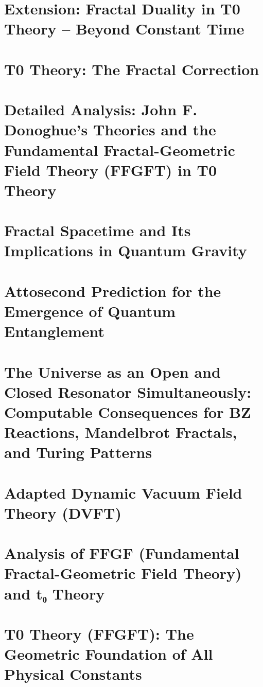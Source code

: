 	\chapter{Extension: Fractal Duality in T0 Theory – Beyond Constant Time}
	
	\chapter{T0 Theory: The Fractal Correction}
	
	\chapter{Detailed Analysis: John F. Donoghue's Theories and the Fundamental Fractal-Geometric Field Theory (FFGFT) in T0 Theory}
	
	\chapter{Fractal Spacetime and Its Implications in Quantum Gravity}
	
	\chapter{Attosecond Prediction for the Emergence of Quantum Entanglement}
	
	\chapter{The Universe as an Open and Closed Resonator Simultaneously: Computable Consequences for BZ Reactions, Mandelbrot Fractals, and Turing Patterns}
	
	\chapter{Adapted Dynamic Vacuum Field Theory (DVFT)}
	
	\chapter{Analysis of FFGF (Fundamental Fractal-Geometric Field Theory) and t₀ Theory}
	
	\chapter{T0 Theory (FFGFT): The Geometric Foundation of All Physical Constants}
	

